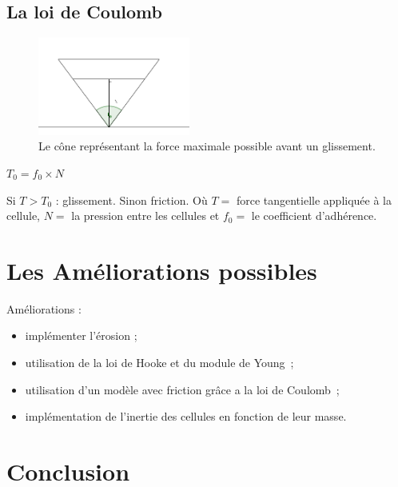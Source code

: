 \documentclass{beamer}
\begin{document}
\subsection{La loi de Coulomb}
\begin{frame}
  \begin{figure}
    \begin{center}
      \includegraphics[width=5cm]{Images/friction.png}
    \end{center}
    \caption{Le cône représentant la force maximale possible avant un glissement.}
  \end{figure}
  \begin{center}
    $T_0 = f_0 \times N$
  \end{center}
  Si $T > T_0$ : glissement. Sinon friction. \smallbreak
  Où $T = $ force tangentielle appliquée à la cellule, $N = $ la pression entre les cellules et $f_0 = $ le coefficient d'adhérence.
\end{frame}

\section{Les Améliorations possibles}
\begin{frame}
  Améliorations :
  \begin{itemize}
    \item implémenter l'érosion ;
    \item utilisation de la loi de Hooke et du module de Young~;
    \item utilisation d'un modèle avec friction grâce a la loi de Coulomb~;
    \item implémentation de l'inertie des cellules en fonction de leur masse.
  \end{itemize}
\end{frame}

\section{Conclusion}
\begin{frame}
 
\end{frame}
\end{document}
